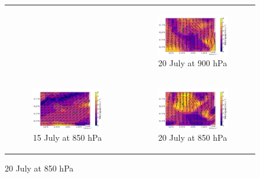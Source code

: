 \begin{figure}[hbtp]
\begin{tabular}{cc}
\begin{subfigure}[t]{0.5\textwidth}
        \end{subfigure} &
        \begin{subfigure}[t]{0.5\textwidth}
            \caption{20 July at 900 hPa}
            \includegraphics[width=\textwidth]{images/chap6/IOP_maps/mesoNH_wind_900_2021-07-20T12:00:00.png}
        \end{subfigure} \\
        \begin{subfigure}[t]{0.5\textwidth}
            \caption{15 July at 850 hPa}
            \includegraphics[width=\textwidth]{images/chap6/IOP_maps/mesoNH_wind_850_2021-07-15T12:00:00.png}
        \end{subfigure} &
        \begin{subfigure}[t]{0.5\textwidth}
            \caption{20 July at 850 hPa}
            \includegraphics[width=\textwidth]{images/chap6/IOP_maps/mesoNH_wind_850_2021-07-20T12:00:00.png}

\end{subfigure}
\end{tabular}
\end{figure}
